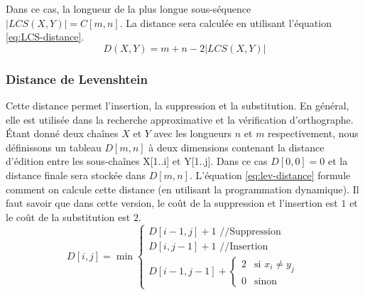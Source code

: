 \documentclass{KodeBook}
\begin{document}
Dans ce cas, la longueur de la plus longue sous-séquence $|LCS(X, Y)| = C[m, n]$.
La distance sera calculée en utilisant l'équation \ref{eq:LCS-distance}.
\begin{equation}
	D(X, Y) = m + n - 2 |LCS(X, Y)|
	\label{eq:LCS-distance}
\end{equation}

\subsubsection{Distance de Levenshtein}

Cette distance permet l'insertion, la suppression et la substitution.
En général, elle est utilisée dans la recherche approximative et la vérification d'orthographe.
Étant donné deux chaînes $X$ et $Y$ avec les longueurs $n$ et $m$ respectivement, nous définissons un tableau $D[m, n]$ à deux dimensions contenant la distance d'édition entre les sous-chaînes X[1..i] et Y[1..j]. 
Dans ce cas $D[0, 0] = 0$ et la distance finale sera stockée dans $D[m, n]$.
L'équation \ref{eq:lev-distance} formule comment on calcule cette distance (en utilisant la programmation dynamique).
Il faut savoir que dans cette version, le coût de la suppression et l'insertion est $1$ et le coût de la substitution est $2$.
\begin{equation}
	D[i, j] = \min 
	\begin{cases}
		D[i - 1, j] + 1 \text{ //Suppression}\\
		D[i, j-1] + 1 \text{ //Insertion}\\
		D[i-1, j-1] + \begin{cases}
			2 & \text{si } x_i \ne y_j \\
			0 & \text{sinon}
		\end{cases}
	\end{cases}
	\label{eq:lev-distance}
\end{equation}
\end{document}
